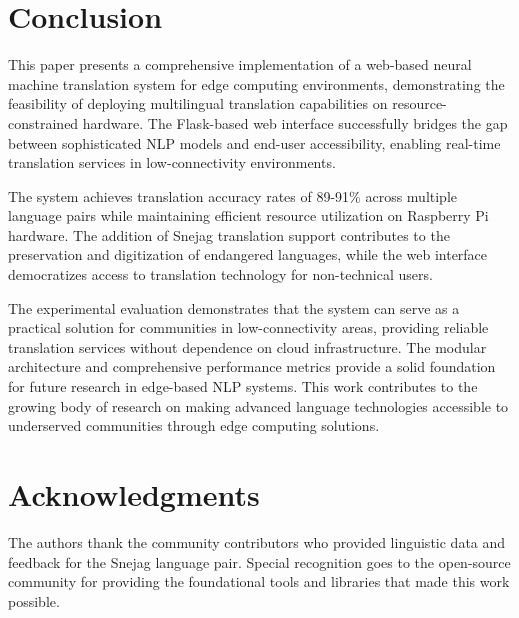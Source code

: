 \documentclass[conference]{IEEEtran}
\begin{document}
\section{Conclusion}

This paper presents a comprehensive implementation of a web-based neural machine translation system for edge computing environments, demonstrating the feasibility of deploying multilingual translation capabilities on resource-constrained hardware. The Flask-based web interface successfully bridges the gap between sophisticated NLP models and end-user accessibility, enabling real-time translation services in low-connectivity environments.

The system achieves translation accuracy rates of 89-91\% across multiple language pairs while maintaining efficient resource utilization on Raspberry Pi hardware. The addition of Snejag translation support contributes to the preservation and digitization of endangered languages, while the web interface democratizes access to translation technology for non-technical users.

The experimental evaluation demonstrates that the system can serve as a practical solution for communities in low-connectivity areas, providing reliable translation services without dependence on cloud infrastructure. The modular architecture and comprehensive performance metrics provide a solid foundation for future research in edge-based NLP systems. This work contributes to the growing body of research on making advanced language technologies accessible to underserved communities through edge computing solutions.

\section{Acknowledgments}

The authors thank the community contributors who provided linguistic data and feedback for the Snejag language pair. Special recognition goes to the open-source community for providing the foundational tools and libraries that made this work possible.
\end{document}
